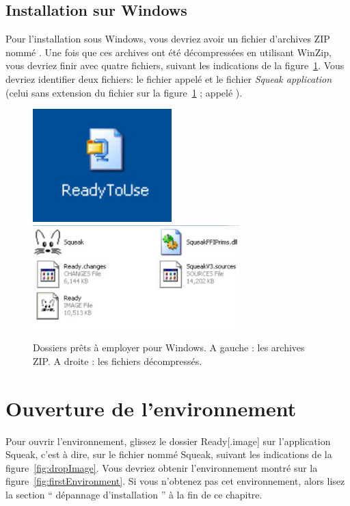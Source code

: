 \documentclass[a4paper,10pt,twoside]{book}
\begin{document}
\subsection{Installation sur Windows}

Pour l'installation sous Windows, vous devriez avoir un fichier d'archives ZIP nomm\'e . Une fois que ces archives ont \'et\'e d\'ecompress\'ees en utilisant WinZip, vous devriez finir avec quatre fichiers, suivant les indications de la figure~\ref{fig:pcfiles}. Vous devriez identifier deux fichiers: le fichier appel\'e  et le fichier \emph{Squeak application} (celui sans extension du fichier sur la figure~\ref{fig:pcfiles} ; appel\'e \Squeak).

\begin{figure}[h]\centerline{\includegraphics{3-zipPC}\includegraphics[width=8cm]{4-readyPC}} 
\caption{Dossiers pr\^ets \`a employer pour Windows. A gauche : les archives ZIP. A droite : les fichiers d\'ecompress\'es. \label{fig:pcfiles}}
\end{figure}


\section{Ouverture de l'environnement}

Pour ouvrir l'environnement, glissez le dossier Ready[.image] sur l'application Squeak, c'est \`a dire, sur le fichier nomm\'e Squeak, suivant les indications de la figure~\ref{fig:dropImage}. Vous devriez obtenir l'environnement montr\'e sur la figure~\ref{fig:firstEnvironment}. Si vous n'obtenez pas cet environnement, alors lisez la section `` d\'epannage d'installation '' \`a la fin de ce chapitre.
\end{document}
